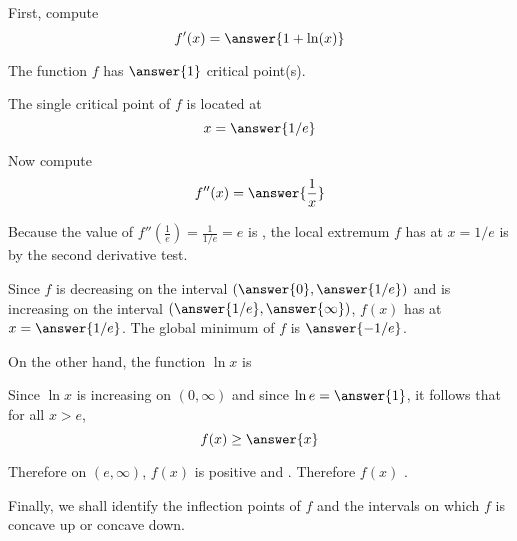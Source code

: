 \documentclass{ximera}
\begin{document}
\begin{exercise}
\begin{exercise}
\begin{exercise}
\begin{exercise}
First, compute 
\[
f'(x)=\answer{1+\ln(x)}
\]
\begin{exercise}
The function $f$ has $\answer{1}$ critical point(s). 
\begin{exercise}
The single critical point of $f$ is located at
\[
x=\answer{1/e}
\]
\begin{exercise}
Now compute
\[
f''(x)=\answer{\frac{1}{x}}
\]
\begin{exercise}
Because the value of $f''(\frac{1}{e})=\frac{1}{1/e}=e$ is , the local extremum $f$ has at $x=1/e$ is  by the second derivative test.
\begin{exercise}
Since $f$ is decreasing on the interval $(\answer{0},\answer{1/e})$ and is increasing on the interval $(\answer{1/e},\answer{\infty})$, $f(x)$ has  at $x=\answer{1/e}$. The global minimum of $f$ is $\answer{-1/e}$.
\begin{exercise}
On the other hand, the function $\ln x$ is 
\begin{multipleChoice}
\end{multipleChoice}
\begin{exercise}
Since $\ln x$ is increasing on $(0,\infty)$ and since $\ln e=\answer{1}$, it follows that for all $x>e$, 
\[
f(x)\ge \answer{x}
\]
\begin{exercise}
Therefore on $(e,\infty)$, $f(x)$ is positive and  . Therefore $f(x)$ .
\begin{exercise}
Finally, we shall identify the inflection points of $f$ and the intervals on which $f$ is concave up or concave down.


\end{exercise}
\end{exercise}
\end{exercise}
\end{exercise}
\end{exercise}
\end{exercise}
\end{exercise}
\end{exercise}
\end{exercise}
\end{exercise}
\end{exercise}
\end{exercise}
\end{exercise}
\end{document}
